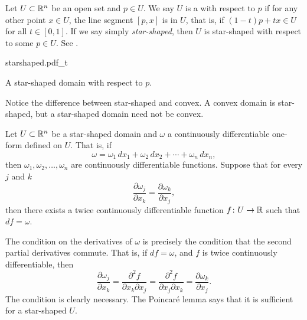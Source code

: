 \begin{defn}
Let $U \subset {\mathbb{R}}^n$ be an open set and $p \in U$.  We say $U$ is
a \emph{}
with respect to $p$ if for any other point $x \in U$,
the line segment $[p,x]$ is in $U$, that is, if
$(1-t)p + tx \in U$ for all $t \in [0,1]$.
If we say simply \emph{star-shaped}, then $U$ is star-shaped with respect to
some $p \in U$.  See .
\begin{myfigureht}
{starshaped.pdf_t}
\caption{A star-shaped domain with respect to $p$.\label{fig:starshaped}}
\end{myfigureht}
\end{defn}

Notice the difference between star-shaped and convex.  A convex domain is
star-shaped, but a star-shaped domain need not be convex.

\begin{thm}
Let $U \subset {\mathbb{R}}^n$ be a star-shaped domain and $\omega$ a continuously
differentiable one-form defined on $U$.  That is, if
\begin{equation*}
\omega =
\omega_1 \,dx_1 +
\omega_2 \,dx_2 + \cdots +
\omega_n \,dx_n ,
\end{equation*}
then $\omega_1,\omega_2,\ldots,\omega_n$ are continuously differentiable
functions.  Suppose that for every $j$ and $k$
\begin{equation*}
\frac{\partial \omega_j}{\partial x_k} = \frac{\partial \omega_k}{\partial x_j} ,
\end{equation*}
then there exists a twice continuously differentiable function $f \colon U
\to {\mathbb{R}}$
such that $df = \omega$.
\end{thm}

The condition on the derivatives of $\omega$ is precisely the condition
that the second partial derivatives commute.  That is, if $df = \omega$,
and $f$ is twice continuously differentiable, then
\begin{equation*}
\frac{\partial \omega_j}{\partial x_k}
=
\frac{\partial^2 f}{\partial x_k \partial x_j} 
=
\frac{\partial^2 f}{\partial x_j \partial x_k} 
=
\frac{\partial \omega_k}{\partial x_j} .
\end{equation*}
The condition is clearly necessary.  The Poincar\'e lemma says that it is
sufficient for a star-shaped $U$.

